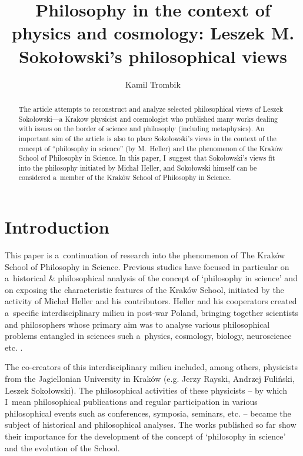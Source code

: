 \documentclass[%
  manuscript=article,
  year=2024,
  volume=77,
  doi=00000.000,
]{zfn}
\title{Philosophy in the context of physics and cosmology: Leszek M. Sokołowski's philosophical views}
\author{Kamil Trombik}
\affiliation{The Pontifical University of John Paul II in Krakow}
\begin{document}
\begin{abstract}
The article attempts to reconstruct and analyze selected philosophical views of Leszek Sokołowski---a Krakow physicist and cosmologist who published many works dealing with issues on the border of science and philosophy (including metaphysics). An important aim of the article is also to place Sokołowski's views in the context of the concept of ``philosophy in science'' (by M.~Heller) and the phenomenon of the Kraków School of Philosophy in Science. In this paper, I~suggest that Sokołowski's views fit into the philosophy initiated by Michał Heller, and Sokołowski himself can be considered a~member of the Kraków School of Philosophy in Science.
\end{abstract}






\section{Introduction}

This paper is a~continuation of research into the phenomenon of The Kraków School of Philosophy in Science. Previous studies 
\parencites[][p.226]{Trombik2021Koncepcje}[][]{Polak2022Krakow}[][]{Trombik2023Andrzej} %
 have focused in particular on a~historical \& philosophical analysis of the concept of ‘philosophy in science' and on exposing the characteristic features of the Kraków School, initiated by the activity of Michał Heller and his contributors. Heller and his cooperators created a~specific interdisciplinary milieu in post-war Poland, bringing together scientists and philosophers whose primary aim was to analyse various philosophical problems entangled in sciences such a~physics, cosmology, biology, neuroscience etc. 
\parencites[][]{Trombik2019origin}[][]{Polak2019Philosophy}.%




The co-creators of this interdisciplinary milieu included, among others, physicists from the Jagiellonian University in Kraków (e.g. Jerzy Rayski, Andrzej Fuliński, Leszek Sokołowski). The philosophical activities of these physicists -- by which I~mean philosophical publications and regular participation in various philosophical events such as conferences, symposia, seminars, etc. -- became the subject of historical and philosophical analyses. The works published so far show their importance for the development of the concept of ‘philosophy in science' and the evolution of the School.
\end{document}
